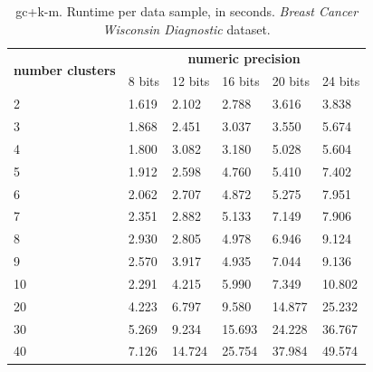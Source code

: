 \begin{table}[htp]
\centering
\caption{\acs{gc}+\acs{k-m}. Runtime per data sample, in seconds. \emph{Breast Cancer Wisconsin Diagnostic} dataset.}
\label{table:runtimeKMBCW}
\begin{tabular}{|l|l|l|l|l|l|}
\hline
\multirow{2}{*}{\textbf{number clusters}} & \multicolumn{5}{c|}{\textbf{numeric precision}}                                             \\ \cline{2-6} 
                                          & 8 bits & 12 bits & 16 bits & 20 bits & 24 bits \\ \hline
2                                & 1.619           & 2.102            & 2.788            & 3.616            & 3.838            \\ \hline
3                                & 1.868           & 2.451            & 3.037            & 3.550            & 5.674            \\ \hline
4                                & 1.800           & 3.082            & 3.180            & 5.028            & 5.604            \\ \hline
5                                & 1.912           & 2.598            & 4.760            & 5.410            & 7.402            \\ \hline
6                                & 2.062           & 2.707            & 4.872            & 5.275            & 7.951            \\ \hline
7                                & 2.351           & 2.882            & 5.133            & 7.149            & 7.906            \\ \hline
8                                & 2.930           & 2.805            & 4.978            & 6.946            & 9.124            \\ \hline
9                                & 2.570           & 3.917            & 4.935            & 7.044            & 9.136            \\ \hline
10                               & 2.291           & 4.215            & 5.990            & 7.349            & 10.802           \\ \hline
20                               & 4.223           & 6.797            & 9.580            & 14.877           & 25.232           \\ \hline
30                               & 5.269           & 9.234            & 15.693           & 24.228           & 36.767           \\ \hline
40                               & 7.126           & 14.724           & 25.754           & 37.984           & 49.574           \\ \hline

\end{tabular}
\end{table}
